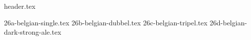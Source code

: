 \clearpage
{}
\divisorLine
{header.tex}
\begin{multicols*}{2}
{26a-belgian-single.tex}
{26b-belgian-dubbel.tex}
{26c-belgian-tripel.tex}
{26d-belgian-dark-strong-ale.tex}
\end{multicols*}